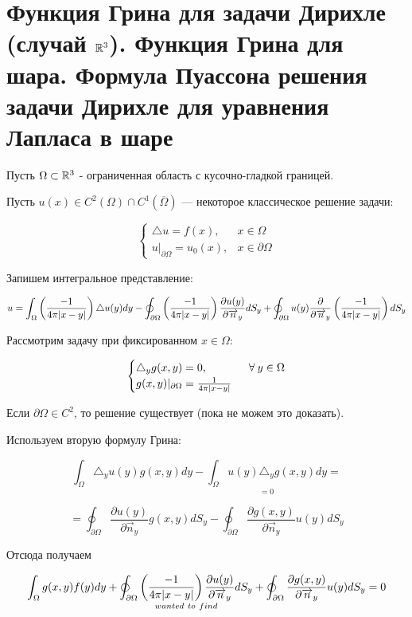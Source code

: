 \section{Функция Грина для задачи Дирихле (случай $\mathbb{R}^3$). Функция Грина для шара. Формула Пуассона решения задачи Дирихле для уравнения Лапласа в шаре}

Пусть $\Omega \subset \mathbb{R}^3$ - ограниченная область с кусочно-гладкой границей.

Пусть $u(x) \in C^2(\Omega) \cap C^1(\overline{\Omega})$ --- некоторое классическое решение задачи:

\[\begin{cases}
   \triangle u = f(x), & x\in \Omega \\
   u|_{\partial \Omega} = u_0(x), & x \in \partial \Omega  
\end{cases}\]  

Запишем интегральное представление:

$$ u = \int_{\Omega}{\left(\frac{-1}{4 \pi |x-y|}\right)  {\triangle u(y)} dy} - \oint_{\partial \Omega}{\left(\frac{-1}{4 \pi |x-y|}\right) \frac{\partial u(y)}{\partial \overrightarrow{n}_y} d S_y} + 
\oint_{\partial \Omega}{ {u(y)} \frac{\partial}{\partial \overrightarrow{n}_y}\left(\frac{-1}{4 \pi |x-y|}\right)d S_y}
$$

Рассмотрим задачу при фиксированном $x \in \Omega$:

\[\begin{cases}
   \triangle_y g(x,y) = 0, & \;\;\forall\: y \in \Omega \\
   g(x,y)|_{\partial \Omega} = \frac{1}{4 \pi |x-y|}  
\end{cases}\] 

Если $\partial \Omega \in C^2$, то решение существует (пока не можем это доказать).

Используем вторую формулу Грина:

$$ \int_{\Omega}{\triangle_y u(y) g(x,y)dy} - 
{\underset{=0}{\int_{\Omega}{u(y) \triangle_y g(x,y) dy}}}=$$

$$=\oint_{\partial \Omega} {\frac{\partial u(y)}{\partial \overrightarrow{n}_y} g(x,y) dS_y} - \oint_{\partial \Omega} {\frac{\partial g(x,y)}{\partial \overrightarrow{n}_y} u(y) dS_y} $$

Отсюда получаем

$$\int_{\Omega}{g(x,y) f(y) dy} + \underset{wanted~to~find}{\oint_{\partial \Omega}{\left(\frac{-1}{4 \pi |x-y|}\right) \frac{\partial u(y)}{\partial \overrightarrow{n}_y} d S_y}}+ \oint_{\partial \Omega}
{\frac{\partial g(x,y)}{\partial \overrightarrow{n}_y}u(y) dS_y} = 0
$$

